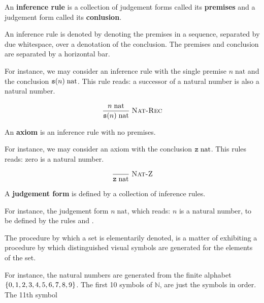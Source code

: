 \begin{definition}

An \textbf{inference rule} is a collection of judgement forms called its
\textbf{premises} and a judgement form called its \textbf{conlusion}.

\end{definition}

\begin{notation}

An inference rule is denoted by denoting the premises in a sequence, separated
by due whitespace, over a denotation of the conclusion. The premises and
conclusion are separated by a horizontal bar.

\end{notation}

For instance, we may consider an inference rule with the single premise
$n\;\text{nat}$ and the conclusion $\mathtt{s}(n)\;\text{nat}$. This rule reads:
a successor of a natural number is also a natural number.

$$
\judgement[Nat-Rec]{
  n\;\text{nat}
}{
  \symb{s}(n)\;\text{nat}
}
$$

\begin{definition}

An \textbf{axiom} is an inference rule with no premises.

\end{definition}

For instance, we may consider an axiom with the conclusion
$\mathtt{z}\;\text{nat}$. This rules reads: zero is a natural number.

$$
\judgement[Nat-Z]{
}{
  \symb{z}\;\text{nat}
}
$$

\begin{definition}

A \textbf{judgement form} is defined by a collection of inference rules.

\end{definition}

For instance, the judgement form $n\;\text{nat}$, which reads: $n$ is a natural
number, to be defined by the rules  and .

\pagebreak



The procedure by which a set is elementarily denoted, is a matter of exhibiting
a procedure by which distinguished visual symbols are generated for the
elements of the set.

For instance, the natural numbers are generated from the finite alphabet
$\left\{{0,1,2,3,4,5,6,7,8,9}\right\}$. The first 10 symbols of $\mathbb{N}$, are just the symbols in order. The 11th symbol


